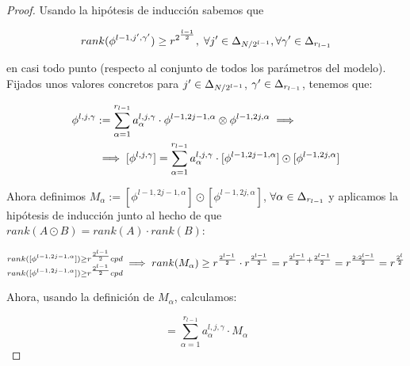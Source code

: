 \begin{proof}
    Usando la hipótesis de inducción sabemos que

    \begin{equation}
        rank(\phi^{l-1, j', \gamma'}) \geq r^{2^{\frac{l - 1}{2}}},
        \; \forall j' \in \Delta_{N/2^{l-1}}, \forall \gamma' \in \Delta_{r_{l-1}}
    \end{equation}

    en casi todo punto (respecto al conjunto de todos los parámetros del modelo). Fijados unos valores concretos para $j' \in \Delta_{N/2^{l-1}}$, $\gamma' \in \Delta_{r_{l-1}}$, tenemos que:

    \begin{equation}
    \begin{split}
        \phi^{l, j, \gamma} &:= \sum_{\alpha = 1}^{r_{l-1}} a_{\alpha}^{l, j, \gamma} \cdot \phi^{l-1, 2j-1, \alpha} \otimes \phi^{l-1, 2j, \alpha} \implies \\
        &\implies [\phi^{l, j, \gamma}] = \sum_{\alpha = 1}^{r_{l-1}} a_{\alpha}^{l, j, \gamma} \cdot [\phi^{l-1, 2j-1, \alpha}] \odot [\phi^{l-1, 2j, \alpha}]
    \end{split}
    \end{equation}

    Ahora definimos $M_\alpha := [\phi^{l-1, 2j-1, \alpha}] \odot [\phi^{l-1, 2j, \alpha}]$, $\forall \alpha \in \Delta_{r_{l-1}}$ y aplicamos la hipótesis de inducción junto al hecho de que $rank(A \odot B) = rank(A) \cdot rank(B)$:

    \begin{equation}
    \begin{split}
        \substack{rank([\phi^{l-1, 2j-1, \alpha}]) \geq r^{\frac{2^{l-1}}{2}} cpd \\ rank([\phi^{l-1, 2j-1, \alpha}]) \geq r^{\frac{2^{l-1}}{2}} cpd} \implies         rank(M_\alpha) \geq r^{\frac{2^{l-1}}{2}} \cdot r^{\frac{2^{l-1}}{2}} = r^{\frac{2^{l-1}}{2} + \frac{2^{l-1}}{2}} =
        r^{\frac{2 \cdot 2^{l - 1}}{2}} = r^{\frac{2^{l}}{2}} \\
    \end{split}
    \end{equation}

    Ahora, usando la definición de $M_\alpha$, calculamos:

    \begin{equation}
        [\phi^{l, j, \gamma}] = \sum_{\alpha = 1}^{r_{l-1}} a_{\alpha}^{l, j, \gamma} \cdot M_\alpha
    \end{equation}


\end{proof}

